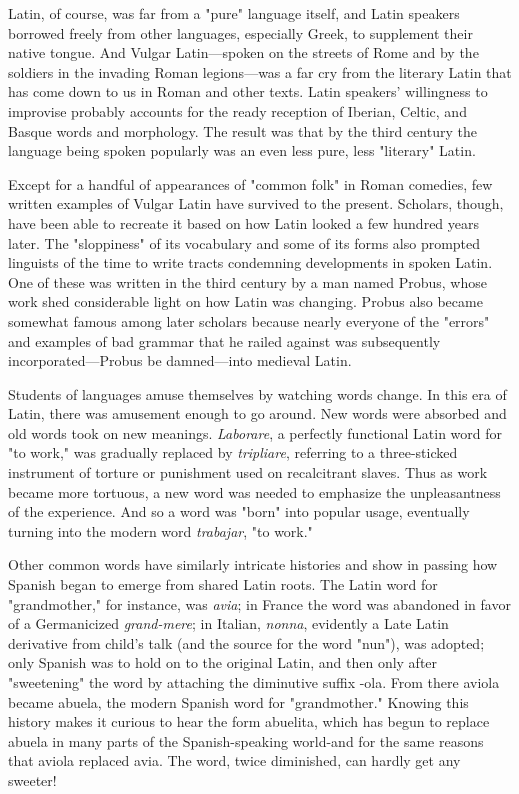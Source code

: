Latin, of course, was far from a "pure" language itself, and
Latin speakers borrowed freely from other languages, especially Greek,
to supplement their native tongue. And Vulgar Latin---spoken on the
streets of Rome and by the soldiers in the invading Roman legions---was a far cry from the literary Latin that has come down to us in Roman and other texts. Latin speakers' willingness to improvise probably
accounts for the ready reception of Iberian, Celtic, and Basque words
and morphology. The result was that by the third century the language
being spoken popularly was an even less pure, less "literary" Latin.

Except for a handful of appearances of "common folk" in Roman comedies, few written examples of Vulgar Latin have survived
to the present. Scholars, though, have been able to recreate it based
on how Latin looked a few hundred years later. The "sloppiness" of
its vocabulary and some of its forms also prompted linguists of the
time to write tracts condemning developments in spoken Latin. One
of these was written in the third century by a man named Probus,
whose work shed considerable light on how Latin was changing. Probus also became somewhat famous among later scholars because
nearly everyone of the "errors" and examples of bad grammar that he
railed against was subsequently incorporated---Probus be damned---into medieval Latin.

Students of languages amuse themselves by watching words
change. In this era of Latin, there was amusement enough to go
around. New words were absorbed and old words took on new meanings. \emph{Laborare}, a perfectly functional Latin word for "to work," was
gradually replaced by \emph{tripliare}, referring to a three-sticked instrument
of torture or punishment used on recalcitrant slaves. Thus as work
became more tortuous, a new word was needed to emphasize the unpleasantness of the experience. And so a word was "born" into popular
usage, eventually turning into the modern word \emph{trabajar}, "to work."

Other common words have similarly intricate histories and
show in passing how Spanish began to emerge from shared Latin roots.
The Latin word for "grandmother," for instance, was \emph{avia}; in France
the word was abandoned in favor of a Germanicized \emph{grand-mere}; in
Italian, \emph{nonna}, evidently a Late Latin derivative from child's talk (and
the source for the word "nun"), was adopted; only Spanish was to hold
on to the original Latin, and then only after "sweetening" the word
by attaching the diminutive suffix -ola. From there aviola became
abuela, the modern Spanish word for "grandmother." Knowing this
history makes it curious to hear the form abuelita, which has begun to
replace abuela in many parts of the Spanish-speaking world-and for
the same reasons that aviola replaced avia. The word, twice diminished, can hardly get any sweeter!

